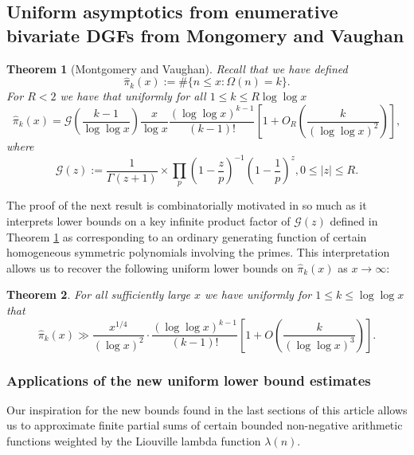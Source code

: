 \documentclass[11pt,reqno,a4letter]{article}
\numberwithin{figure}{section}
\numberwithin{table}{section}
\theoremstyle{plain}
\newtheorem{theorem}{Theorem}
\numberwithin{theorem}{section}
\theoremstyle{definition}
\begin{document}
\subsection{Uniform asymptotics from enumerative bivariate DGFs from Mongomery and Vaughan} 

\begin{theorem}[Montgomery and Vaughan]
\label{theorem_HatPi_ExtInTermsOfGz} 
Recall that we have defined 
$$\widehat{\pi}_k(x) := \#\{n \leq x: \Omega(n)=k\}.$$ 
For $R < 2$ we have that uniformly for all $1 \leq k \leq R \log\log x$ 
\[
\widehat{\pi}_k(x) = \mathcal{G}\left(\frac{k-1}{\log\log x}\right) \frac{x}{\log x} 
     \frac{(\log\log x)^{k-1}}{(k-1)!} \left[1 + O_R\left(\frac{k}{(\log\log x)^2}\right)\right], 
\]
where 
\[
\mathcal{G}(z) := \frac{1}{\Gamma(z+1)} \times 
     \prod_p \left(1-\frac{z}{p}\right)^{-1} \left(1-\frac{1}{p}\right)^z, 0 \leq |z| \leq R. 
\]
\end{theorem} 

The proof of the next result is combinatorially motivated in so much as it interprets 
lower bounds on a key infinite product factor of $\mathcal{G}(z)$ defined in 
Theorem \ref{theorem_HatPi_ExtInTermsOfGz} 
as corresponding to an ordinary generating function of certain 
homogeneous symmetric polynomials involving the primes. This interpretation allows us to recover the 
following uniform lower bounds on $\widehat{\pi}_k(x)$ as $x \rightarrow \infty$: 

\begin{theorem} 
\label{theorem_GFs_SymmFuncs_SumsOfRecipOfPowsOfPrimes} 
\label{cor_BoundsOnGz_FromMVBook_initial_stmt_v1} 
For all sufficiently large $x$ we have uniformly for $1 \leq k \leq \log\log x$ that 
\[
\widehat{\pi}_k(x) \gg 
     \frac{x^{1/4}}{(\log x)^{2}} \cdot 
     \frac{(\log\log x)^{k-1}}{(k-1)!} \left[1 + 
     O\left(\frac{k}{(\log\log x)^3}\right)\right]. 
\]
\end{theorem} 

\subsubsection{Applications of the new uniform lower bound estimates} 

Our inspiration for the new bounds found in the last sections of this article allows us to 
approximate finite partial sums of certain bounded 
non-negative arithmetic functions weighted by the Liouville lambda function 
$\lambda(n)$. 
\end{document}
